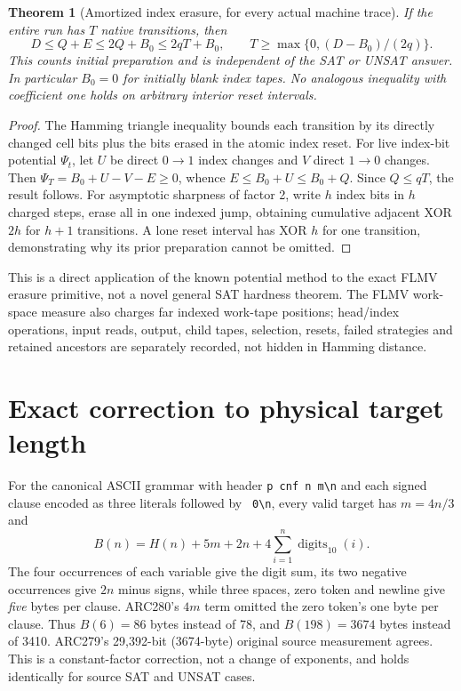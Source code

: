 \documentclass[10pt]{article}
\newtheorem{theorem}{Theorem}
\begin{document}
\begin{theorem}[Amortized index erasure, for every actual machine trace]
If the entire run has $T$ native transitions, then
\[
\boxed{D\le Q+E\le 2Q+B_0\le 2qT+B_0},\qquad
T\ge\max\{0,(D-B_0)/(2q)\}.
\]
This counts initial preparation and is independent of the SAT or UNSAT answer. In particular $B_0=0$ for initially blank index tapes. No analogous inequality with coefficient one holds on arbitrary interior reset intervals.
\end{theorem}
\begin{proof}
The Hamming triangle inequality bounds each transition by its directly changed cell bits plus the bits erased in the atomic index reset. For live index-bit potential $\Psi_t$, let $U$ be direct $0\to1$ index changes and $V$ direct $1\to0$ changes. Then $\Psi_T=B_0+U-V-E\ge0$, whence $E\le B_0+U\le B_0+Q$. Since $Q\le qT$, the result follows. For asymptotic sharpness of factor 2, write $h$ index bits in $h$ charged steps, erase all in one indexed jump, obtaining cumulative adjacent XOR $2h$ for $h+1$ transitions. A lone reset interval has XOR $h$ for one transition, demonstrating why its prior preparation cannot be omitted.
\end{proof}
This is a direct application of the known potential method to the exact FLMV erasure primitive, not a novel general SAT hardness theorem. The FLMV work-space measure also charges far indexed work-tape positions; head/index operations, input reads, output, child tapes, selection, resets, failed strategies and retained ancestors are separately recorded, not hidden in Hamming distance.

\section{Exact correction to physical target length}
For the canonical ASCII grammar with header \texttt{p cnf n m\textbackslash n} and each signed clause encoded as three literals followed by \texttt{ 0\textbackslash n}, every valid target has $m=4n/3$ and
\[
\boxed{B(n)=H(n)+5m+2n+4\sum_{i=1}^n\operatorname{digits}_{10}(i).}
\]
The four occurrences of each variable give the digit sum, its two negative occurrences give $2n$ minus signs, while three spaces, zero token and newline give \emph{five} bytes per clause. ARC280's $4m$ term omitted the zero token's one byte per clause. Thus $B(6)=86$ bytes instead of 78, and $B(198)=3674$ bytes instead of 3410. ARC279's 29,392-bit (3674-byte) original source measurement agrees. This is a constant-factor correction, not a change of exponents, and holds identically for source SAT and UNSAT cases.
\end{document}
